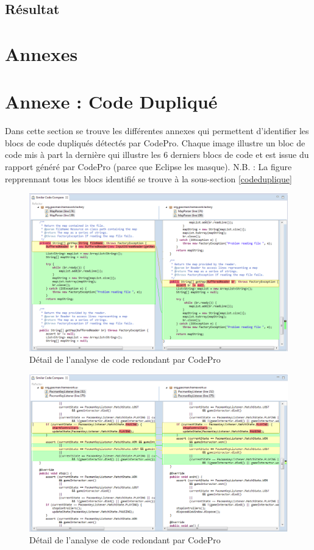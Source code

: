 \documentclass[12pt,a4paper,final]{article}
\begin{document}
\subsection{Résultat}

\clearpage
\newpage
\section{Annexes} \label{sec:annexe}
\appendix %
\section{Annexe : Code Dupliqué}\label{SimilarCode}
Dans cette section se trouve les différentes annexes qui permettent d'identifier les blocs de code dupliqués détectés par CodePro. Chaque image illustre un bloc de code mis à part la dernière qui illustre les 6 derniers blocs de code et est issue du rapport généré par CodePro (parce que Eclipse les masque).
N.B. : La figure repprennant tous les blocs identifié se trouve à la sous-section \ref{codeduplique}

\begin{figure}[ht]
	\centering
	\includegraphics[width=\textwidth]{images/SimilarCode_1.png}
	\caption{\label{SimilarCode1}Détail de l'analyse de code redondant par CodePro}
\end{figure}

\begin{figure}[ht]
	\centering
	\includegraphics[width=\textwidth]{images/SimilarCode_2.png}
	\caption{\label{SimilarCode2}Détail de l'analyse de code redondant par CodePro}
\end{figure}
\end{document}
